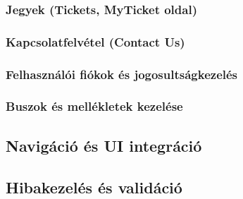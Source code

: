 \subsubsection{Jegyek (Tickets, MyTicket oldal)}



\subsubsection{Kapcsolatfelvétel (Contact Us)}



\subsubsection{Felhasználói fiókok és jogosultságkezelés}



\subsubsection{Buszok és mellékletek kezelése}



\subsection{Navigáció és UI integráció}



\subsection{Hibakezelés és validáció}


